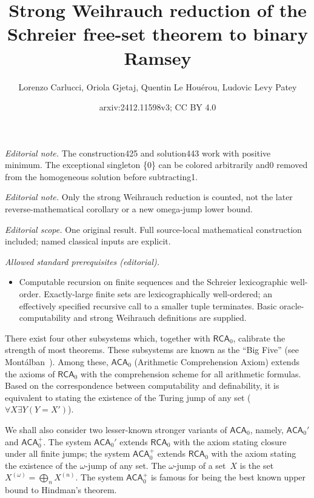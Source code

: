 \documentclass[10pt,a4paper]{article}
\title{Strong Weihrauch reduction of the Schreier free-set theorem to binary Ramsey}
\author{Lorenzo Carlucci, Oriola Gjetaj, Quentin Le Houérou, Ludovic Levy Patey}
\date{arxiv:2412.11598v3; CC BY 4.0}
\newcommand{\RCA}[0]{\mathsf{RCA}}
\newcommand{\ACA}[0]{\mathsf{ACA}}
\def\qt#1{``#1''}%
\numberwithin{theorem}{section}
\begin{document}
\maketitle
\noindent\textit{Editorial note.} The construction425 and solution443 work with positive minimum. The exceptional singleton \{0\} can be colored arbitrarily and0 removed from the homogeneous solution before subtracting1.\par\medskip
\noindent\textit{Editorial note.} Only the strong Weihrauch reduction is counted, not the later reverse-mathematical corollary or a new omega-jump lower bound.\par\medskip
\noindent\textit{Editorial scope.} One original result. Full source-local mathematical construction included; named classical inputs are explicit.\par\medskip
\noindent\textit{Allowed standard prerequisites (editorial).}\begin{itemize}
\item Computable recursion on finite sequences and the Schreier lexicographic well-order. Exactly-large finite sets are lexicographically well-ordered; an effectively specified recursive call to a smaller tuple terminates. Basic oracle-computability and strong Weihrauch definitions are supplied.
\end{itemize}\medskip
There exist four other subsystems which, together with $\RCA_0$, calibrate the strength of most theorems. These subsystems are known as the \qt{Big Five} (see Mont\'alban~\cite{montalban_open_2011}). Among these, $\ACA_0$ (Arithmetic Comprehension Axiom) extends the axioms of $\RCA_0$ with the comprehension scheme for all arithmetic formulas. Based on the correspondence between computability and definability, it is equivalent to stating the existence of the Turing jump of any set ($\forall X \exists Y (Y = X')$).

We shall also consider two lesser-known stronger variants of $\ACA_0$, namely, $\ACA_0'$ and $\ACA_0^+$. The system $\ACA_0'$ extends $\RCA_0$ with the axiom stating closure under all finite jumps; the system $\ACA_0^+$ extends $\RCA_0$ with the axiom stating the existence of the $\omega$-jump of any set. The $\omega$-jump of a set~$X$ is the set $X^{(\omega)} = \bigoplus_n X^{(n)}$. The system $\ACA_0^+$ is famous for being the best known upper bound to Hindman's theorem.%
\end{document}
